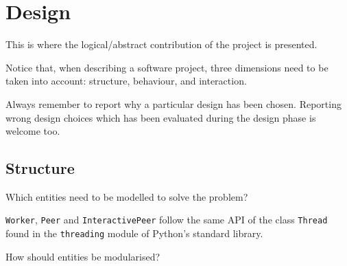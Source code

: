 \documentclass[12pt,a4paper,oneside,article]{article}
\begin{document}
	\section{Design}
		This is where the logical/abstract contribution of the project is presented.
		
		Notice that, when describing a software project, three dimensions need to be taken into account: structure, behaviour, and interaction.
		
		Always remember to report why a particular design has been chosen. Reporting wrong design choices which has been evaluated during the design phase is welcome too.
		
		\subsection{Structure}
			Which entities need to be modelled to solve the problem?
			
			\texttt{Worker}, \texttt{Peer} and \texttt{InteractivePeer} follow the same API of the class \texttt{Thread} found in the \texttt{threading} module of Python's standard library.
			
			
			How should entities be modularised?
			
\end{document}
